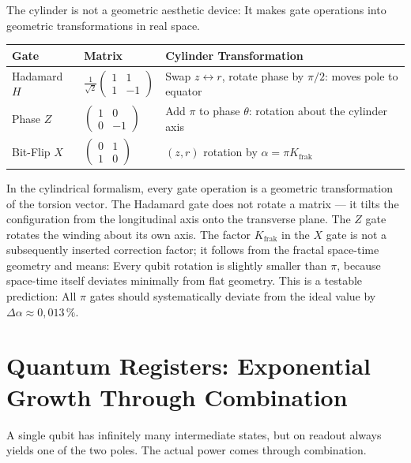 The cylinder is not a geometric aesthetic device: It makes
gate operations into geometric transformations in real space.

\begin{center}
\small\renewcommand{\arraystretch}{1.4}
\begin{tabular}{lp{2.4cm}p{4.2cm}}
\toprule
\textbf{Gate} & \textbf{Matrix} & \textbf{Cylinder Transformation} \\
\midrule
Hadamard $H$ & $\frac{1}{\sqrt2}\begin{pmatrix}1&1\\1&-1\end{pmatrix}$ & Swap $z\leftrightarrow r$, rotate phase by $\pi/2$: moves pole to equator \\
Phase $Z$ & $\begin{pmatrix}1&0\\0&-1\end{pmatrix}$ & Add $\pi$ to phase $\theta$: rotation about the cylinder axis \\
Bit-Flip $X$ & $\begin{pmatrix}0&1\\1&0\end{pmatrix}$ & $(z,r)$ rotation by $\alpha = \pi K_{\mathrm{frak}}$ \\
\bottomrule
\end{tabular}
\end{center}

In the cylindrical formalism, every gate operation is a geometric
transformation of the torsion vector. The Hadamard gate does not rotate a
matrix --- it tilts the configuration from the longitudinal axis onto the
transverse plane. The $Z$ gate rotates the winding about its own
axis. The factor $K_{\mathrm{frak}}$ in the $X$ gate is not a subsequently
inserted correction factor; it follows from the fractal
space-time geometry and means: Every qubit rotation is slightly smaller
than $\pi$, because space-time itself deviates minimally from flat geometry. This is a testable prediction: All $\pi$ gates should
systematically deviate from the ideal value by $\Delta\alpha\approx0{,}013\,\%$.

\section{Quantum Registers: Exponential Growth Through Combination}

A single qubit has infinitely many intermediate states, but on
readout always yields one of the two poles. The actual power comes
through combination.

